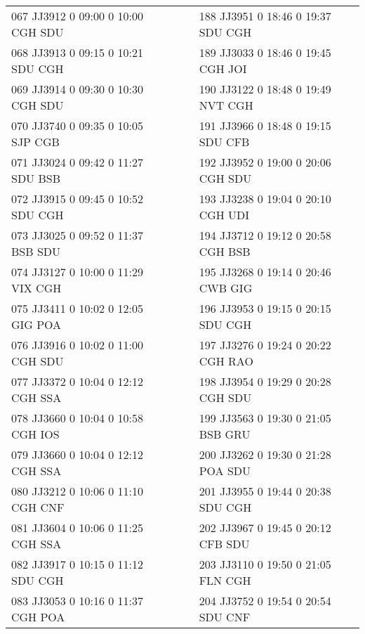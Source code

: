 \begin{scriptsize}
\begin{longtable}{l c c l}
067 JJ3912 0 09:00 0 10:00 CGH SDU & & & 188 JJ3951 0 18:46 0 19:37 SDU CGH \\

068 JJ3913 0 09:15 0 10:21 SDU CGH & & & 189 JJ3033 0 18:46 0 19:45 CGH JOI \\

069 JJ3914 0 09:30 0 10:30 CGH SDU & & & 190 JJ3122 0 18:48 0 19:49 NVT CGH \\

070 JJ3740 0 09:35 0 10:05 SJP CGB & & & 191 JJ3966 0 18:48 0 19:15 SDU CFB \\

071 JJ3024 0 09:42 0 11:27 SDU BSB & & & 192 JJ3952 0 19:00 0 20:06 CGH SDU \\

072 JJ3915 0 09:45 0 10:52 SDU CGH & & & 193 JJ3238 0 19:04 0 20:10 CGH UDI \\

073 JJ3025 0 09:52 0 11:37 BSB SDU & & & 194 JJ3712 0 19:12 0 20:58 CGH BSB \\

074 JJ3127 0 10:00 0 11:29 VIX CGH & & & 195 JJ3268 0 19:14 0 20:46 CWB GIG \\

075 JJ3411 0 10:02 0 12:05 GIG POA & & & 196 JJ3953 0 19:15 0 20:15 SDU CGH \\

076 JJ3916 0 10:02 0 11:00 CGH SDU & & & 197 JJ3276 0 19:24 0 20:22 CGH RAO \\

077 JJ3372 0 10:04 0 12:12 CGH SSA & & & 198 JJ3954 0 19:29 0 20:28 CGH SDU \\

078 JJ3660 0 10:04 0 10:58 CGH IOS & & & 199 JJ3563 0 19:30 0 21:05 BSB GRU \\

079 JJ3660 0 10:04 0 12:12 CGH SSA & & & 200 JJ3262 0 19:30 0 21:28 POA SDU \\

080 JJ3212 0 10:06 0 11:10 CGH CNF & & & 201 JJ3955 0 19:44 0 20:38 SDU CGH \\

081 JJ3604 0 10:06 0 11:25 CGH SSA & & & 202 JJ3967 0 19:45 0 20:12 CFB SDU \\

082 JJ3917 0 10:15 0 11:12 SDU CGH & & & 203 JJ3110 0 19:50 0 21:05 FLN CGH \\

083 JJ3053 0 10:16 0 11:37 CGH POA & & & 204 JJ3752 0 19:54 0 20:54 SDU CNF \\


\end{longtable}
\end{scriptsize}
